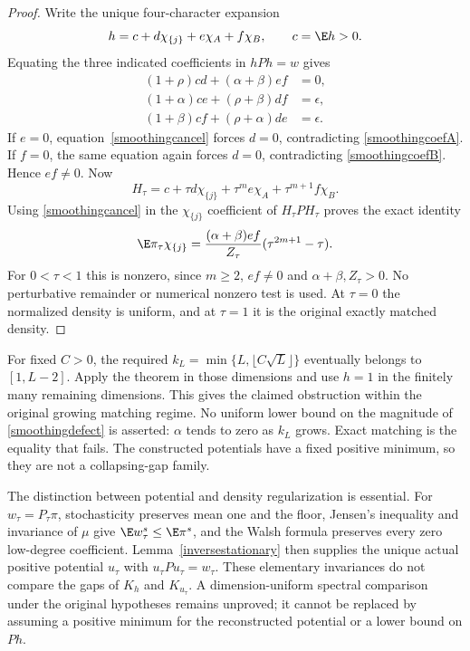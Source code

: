 \begin{proof}
Write the unique four-character expansion
\[
 h=c+d\chi_{\{j\}}+e\chi_A+f\chi_B,\qquad c=\E h>0.
\]
Equating the three indicated coefficients in $hPh=w$ gives
\begin{align}
 (1+\rho)cd+(\alpha+\beta)ef&=0,\label{smoothingcancel}\\
 (1+\alpha)ce+(\rho+\beta)df&=\epsilon,\label{smoothingcoefA}\\
 (1+\beta)cf+(\rho+\alpha)de&=\epsilon.\label{smoothingcoefB}
\end{align}
If $e=0$, equation~\eqref{smoothingcancel} forces $d=0$, contradicting
\eqref{smoothingcoefA}. If $f=0$, the same equation again forces $d=0$,
contradicting \eqref{smoothingcoefB}. Hence $ef\ne0$.
Now
\[
 H_\tau=c+\tau d\chi_{\{j\}}+\tau^m e\chi_A
                         +\tau^{m+1}f\chi_B.
\]
Using \eqref{smoothingcancel} in the $\chi_{\{j\}}$ coefficient of
$H_\tau PH_\tau$ proves the exact identity
\begin{equation}\label{smoothingdefect}
 \E\pi_\tau\chi_{\{j\}}
   =\frac{(\alpha+\beta)ef}{Z_\tau}
                         (\tau^{2m+1}-\tau).
\end{equation}
For $0<\tau<1$ this is nonzero, since $m\geq2$, $ef\ne0$ and
$\alpha+\beta,Z_\tau>0$. No perturbative remainder or numerical
nonzero test is used. At $\tau=0$ the normalized density is uniform,
and at $\tau=1$ it is the original exactly matched density.
\end{proof}

For fixed $C>0$, the required $k_L=\min\{L,\lfloor C\sqrt L\rfloor\}$
eventually belongs to $[1,L-2]$. Apply the theorem in those dimensions
and use $h=1$ in the finitely many remaining dimensions. This gives the
claimed obstruction within the original growing matching regime.
No uniform lower bound on the magnitude of \eqref{smoothingdefect} is
asserted: $\alpha$ tends to zero as $k_L$ grows. Exact matching is the
equality that fails. The constructed potentials have a fixed positive
minimum, so they are not a collapsing-gap family.

The distinction between potential and density regularization is essential.
For $w_\tau=P_\tau\pi$, stochasticity preserves mean one and the floor,
Jensen's inequality and invariance of $\mu$ give
$\E w_\tau^s\leq\E\pi^s$, and the Walsh formula preserves every zero
low-degree coefficient. Lemma~\ref{inversestationary} then supplies the
unique actual positive potential $u_\tau$ with $u_\tau Pu_\tau=w_\tau$.
These elementary invariances do not compare the gaps of $K_h$ and
$K_{u_\tau}$. A dimension-uniform spectral comparison under the original
hypotheses remains unproved; it cannot be replaced by assuming a positive
minimum for the reconstructed potential or a lower bound on $Ph$.
